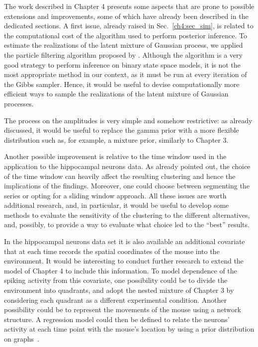 The work described in Chapter 4 presents some aspects that are prone to possible extensions and improvements, some of which have already been described in the dedicated sections. A first issue, already raised in Sec.~\ref{ch4:sec_sim}, is related to the computational cost of the algorithm used to perform posterior inference. To estimate the realizations of the latent mixture of Gaussian process, we applied the particle filtering algorithm proposed by \textcite{fasano2021}. Although the algorithm is a very good strategy to perform inference on binary state space models, it is not the most appropriate method in our context, as it must be run at every iteration of the Gibbs sampler. Hence, it would be useful to devise computationally more efficient ways to sample the realizations of the latent mixture of Gaussian processes.

The process on the amplitudes is very simple and somehow restrictive: as already discussed, it would be useful to replace the gamma prior with a more flexible distribution such as, for example, a mixture prior, similarly to Chapter 3.

Another possible improvement is relative to the time window used in the application to the hippocampal neurons data. As already pointed out, the choice of the time window can heavily affect the resulting clustering and hence the implications of the findings. Moreover, one could choose between segmenting the series or opting for a sliding window approach. All these issues are worth additional research, and, in particular, it would be useful to develop some methods to evaluate the sensitivity of the clustering to the different alternatives, and, possibly, to provide a way to evaluate what choice led to the ``best'' results.

In the hippocampal neurons data set it is also available an additional covariate that at each time records the spatial coordinates of the mouse into the environment. It would be interesting to conduct further research to extend the model of Chapter 4 to include this information. To model dependence of the spiking activity from this covariate, one possibility could be to divide the environment into quadrants, and adopt the nested mixture of Chapter 3 by considering each quadrant as a different experimental condition.
Another possibility could be to represent the movements of the mouse using a network structure. A regression model could then be defined to relate the neurons' activity at each time point with the mouse's location by using a prior distribution on graphs~\parencite{cai2019}. 




